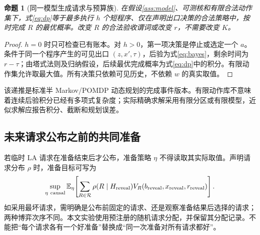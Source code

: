 \documentclass[11pt,a4paper,fontset=fandol]{ctexart}
\newtheorem{proposition}[theorem]{命题}
\theoremstyle{definition}
\theoremstyle{remark}
\numberwithin{equation}{section}
\newcommand{\E}{\mathbb E}
\newcommand{\cR}{\mathcal R}
\begin{document}
\begin{proposition}[同一模型生成请求与预算族]
\label{prop:dp}
在假设\ref{ass:model}、可测核和有限合法动作集下，式\eqref{eq:dp}等于最多执行 $h$ 个短程序、仅在声明出口决策的合法策略中，按时完成 $R$ 的最优概率。改变 $R$ 的合法验收谓词或改变 $r$，不需要改变 $K$。
\end{proposition}
\begin{proof}
$h=0$ 时只可检查已有账本。对 $h>0$，第一项决策是停止或选定一个 $a$。条件于同一个程序产生的可见出口 $(z,x',\tau)$，后验为式\eqref{eq:bayes}，剩余时间为 $r-\tau$；由塔式法则及归纳假设，后续最优完成概率为式\eqref{eq:dp}中的积分。有限动作集允许取最大值。所有决策只依赖可见历史，不依赖 $w$ 的真实取值。
\end{proof}
该递推是标准半 Markov/POMDP 动态规划的完成事件版本\cite{partial,ais}。有限动作库不意味着连续后验积分已经有多项式复杂度；实际精确求解采用有限分区或有限模型，近似求解应报告积分、截断和规划误差。

\subsection{未来请求公布之前的共同准备}
若临时 LA 请求在准备结束后才公布，准备策略 $\eta$ 不得读取其实际取值。声明请求分布 $\rho$ 时，准备目标可写为
\begin{equation}
 \sup_{\eta\ {\rm causal}}
 \E_\eta\!\left[
 \sum_{R\in\cR}\rho(R\mid H_{\rm reveal})
 V_R(b_{\rm reveal},x_{\rm reveal},r_{\rm reveal})
 \right].
 \label{eq:prepare}
\end{equation}
如采用最坏请求，需明确是公布前固定的请求、还是观察准备结果后选择的请求；两种博弈次序不同。本文实验使用预注册的随机请求分配，并保留其分配记录。不能把“每个请求各有一个好准备”替换成“同一次准备对所有请求都好”。
\end{document}
